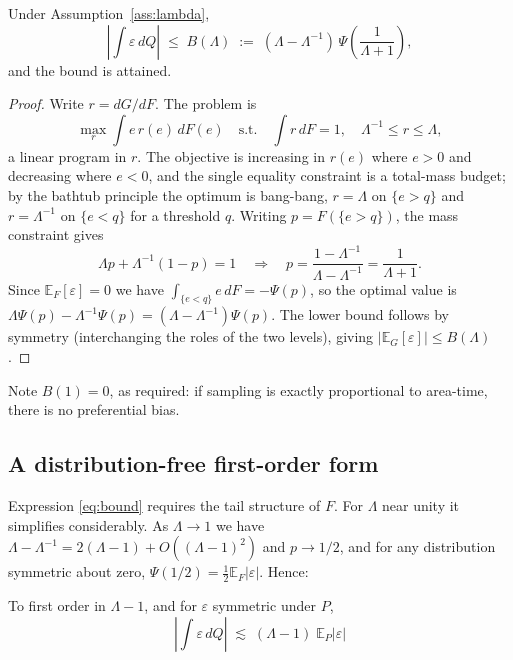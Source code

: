 \begin{proposition}
\label{prop:bound}
Under Assumption~\ref{ass:lambda},
\begin{equation}
  \label{eq:bound}
  \left| \int \varepsilon \, dQ \right|
  \;\le\; B(\Lambda) \;:=\; \left(\Lambda - \Lambda^{-1}\right)\,
  \Psi\!\left(\frac{1}{\Lambda + 1}\right),
\end{equation}
and the bound is attained.
\end{proposition}

\begin{proof}
Write $r = dG/dF$. The problem is
\[
  \max_{r} \int e \, r(e) \, dF(e)
  \quad \text{s.t.} \quad \int r \, dF = 1, \quad \Lambda^{-1} \le r \le \Lambda,
\]
a linear program in $r$. The objective is increasing in $r(e)$ where $e > 0$ and decreasing
where $e < 0$, and the single equality constraint is a total-mass budget; by the bathtub
principle the optimum is bang-bang, $r = \Lambda$ on $\{e > q\}$ and $r = \Lambda^{-1}$ on
$\{e < q\}$ for a threshold $q$. Writing $p = F(\{e > q\})$, the mass constraint gives
\[
  \Lambda p + \Lambda^{-1}(1 - p) = 1
  \quad \Longrightarrow \quad
  p = \frac{1 - \Lambda^{-1}}{\Lambda - \Lambda^{-1}} = \frac{1}{\Lambda + 1}.
\]
Since $\mathbb{E}_F[\varepsilon] = 0$ we have $\int_{\{e < q\}} e \, dF = -\Psi(p)$, so the
optimal value is $\Lambda \Psi(p) - \Lambda^{-1}\Psi(p) = (\Lambda - \Lambda^{-1})\Psi(p)$.
The lower bound follows by symmetry (interchanging the roles of the two levels), giving
$|\mathbb{E}_G[\varepsilon]| \le B(\Lambda)$.
\end{proof}

Note $B(1) = 0$, as required: if sampling is exactly proportional to area-time, there is no
preferential bias.

\subsection{A distribution-free first-order form}
\label{sec:first-order}

Expression \eqref{eq:bound} requires the tail structure of $F$. For $\Lambda$ near unity it
simplifies considerably. As $\Lambda \to 1$ we have $\Lambda - \Lambda^{-1} = 2(\Lambda - 1) +
O((\Lambda-1)^2)$ and $p \to 1/2$, and for any distribution symmetric about zero,
$\Psi(1/2) = \tfrac12 \mathbb{E}_F|\varepsilon|$. Hence:

\begin{corollary}
\label{cor:firstorder}
To first order in $\Lambda - 1$, and for $\varepsilon$ symmetric under $P$,
\begin{equation}
  \label{eq:firstorder}
  \boxed{\;\left| \int \varepsilon \, dQ \right| \;\lesssim\; (\Lambda - 1)\;
  \mathbb{E}_P\left|\varepsilon\right| \;}
\end{equation}
\end{corollary}


